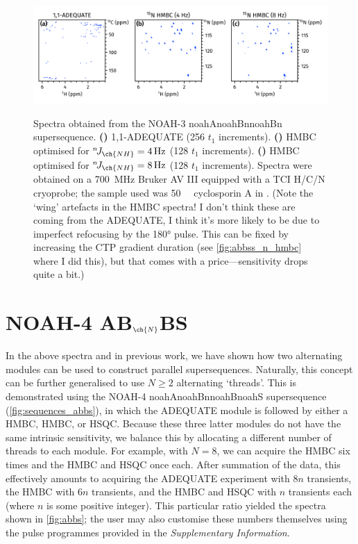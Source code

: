 \documentclass[a4paper,12pt]{article}
\newcommand{\proton}{\ch{^{1}H}}
\newcommand{\carbon}{\ch{^{13}C}}
\newcommand{\nitrogen}{\ch{^{15}N}}
\newcommand{\SInf}{\textit{Supplementary Information}}
\newcommand{\todo}[1]{{\color{OrangeRed}#1}}
\newcommand{\njnh}{{}^n\!J_{\ch{NH}}}
\newcommand*{\cyclo}{Spectra were obtained on a \SI{700}{\MHz} Bruker AV III equipped with a TCI H/C/N cryoprobe; the sample used was \SI{50}{\milli\molar} cyclosporin A in \ch{C6D6}.}
\newcommand*{\noahthree}[3]{\csname noah#1\endcsname\csname noah#2\endcsname\csname noah#3\endcsname}
\newcommand*{\noahfour}[4]{\csname noah#1\endcsname\csname noah#2\endcsname\csname noah#3\endcsname\csname noah#4\endcsname}
\begin{document}
\begin{refsection}
\begin{figure}[ht]
    \centering
    \includegraphics[width=\textwidth]{abb.png}
    {\label{fig:abb_adeq}}
    {\label{fig:abb_n_hmbc1}}
    {\label{fig:abb_n_hmbc2}}
    \caption{
        Spectra obtained from the NOAH-3 \noahthree{A}{Bn}{Bn} supersequence.
        \textbf{()} 1,1-ADEQUATE (256 $t_1$ increments).
        \textbf{()} \nitrogen{} HMBC optimised for $\njnh = \SI{4}{Hz}$ (128 $t_1$ increments).
        \textbf{()} \nitrogen{} HMBC optimised for $\njnh = \SI{8}{Hz}$ (128 $t_1$ increments).
        \cyclo{}
        \todo{(Note the `wing' artefacts in the HMBC spectra! I don't think these are coming from the ADEQUATE, I think it's more likely to be due to imperfect refocusing by the \proton{} \ang{180} pulse. This can be fixed by increasing the CTP gradient duration (see \cref{fig:abbss_n_hmbc} where I did this), but that comes with a price---sensitivity drops quite a bit.)}
    }
    \label{fig:abb}
\end{figure}

\section{NOAH-4 AB\texorpdfstring{$_{\ch{N}}$}{n}BS}

In the above spectra and in previous work,\autocite{Kupce2021JACSA} we have shown how two alternating modules can be used to construct parallel supersequences.
Naturally, this concept can be further generalised to use $N \geq 2$ alternating `threads'.
This is demonstrated using the NOAH-4 \noahfour{A}{Bn}{B}{S} supersequence (\cref{fig:sequences_abbs}), in which the ADEQUATE module is followed by either a \nitrogen{} HMBC, \carbon{} HMBC, or \carbon{} HSQC.
Because these three latter modules do not have the same intrinsic sensitivity, we balance this by allocating a different number of threads to each module.
For example, with $N = 8$, we can acquire the \nitrogen{} HMBC six times and the \carbon{} HMBC and HSQC once each.
After summation of the data, this effectively amounts to acquiring the ADEQUATE experiment with $8n$ transients, the \nitrogen{} HMBC with $6n$ transients, and the \carbon{} HMBC and HSQC with $n$ transients each (where $n$ is some positive integer).
This particular ratio yielded the spectra shown in \cref{fig:abbs}; the user may also customise these numbers themselves using the pulse programmes provided in the \SInf{}.


\end{refsection}
\end{document}
